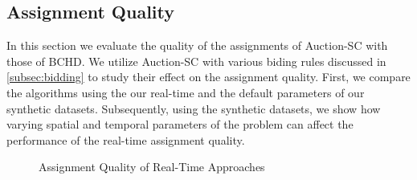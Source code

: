 \subsection{Assignment Quality}
In this section we evaluate the quality of the assignments of Auction-SC with those of BCHD. We utilize Auction-SC with various biding rules discussed in \cref{subsec:bidding} to study their effect on the assignment quality. First, we compare the algorithms using the our real-time and the default parameters of our synthetic datasets. Subsequently, using the synthetic datasets, we show how varying spatial and temporal parameters of the problem can affect the performance of the real-time assignment quality.

\begin{figure}[h]
    \centering
    \vspace{-0.15in}
    \caption{Assignment Quality of Real-Time Approaches}
    \label{fig:quality}
\end{figure}

